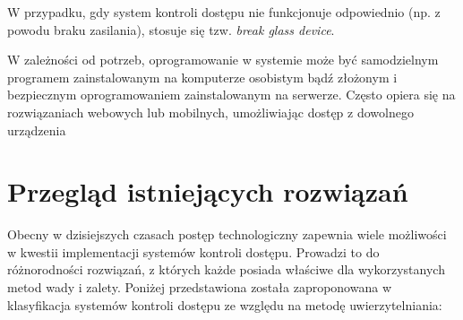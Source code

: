 		W przypadku, gdy system kontroli dostępu nie funkcjonuje odpowiednio (np. z powodu braku zasilania), stosuje się tzw. \textit{break glass device}.

		W zależności od potrzeb, oprogramowanie w systemie może być samodzielnym programem zainstalowanym na komputerze osobistym bądź złożonym i bezpiecznym oprogramowaniem zainstalowanym na serwerze. Często opiera się na rozwiązaniach webowych lub mobilnych, umożliwiając dostęp z dowolnego urządzenia

	\section{Przegląd istniejących rozwiązań}
		
		Obecny w dzisiejszych czasach postęp technologiczny zapewnia wiele możliwości w kwestii implementacji systemów kontroli dostępu. Prowadzi to do różnorodności rozwiązań, z których każde posiada właściwe dla wykorzystanych metod wady i zalety. Poniżej przedstawiona została zaproponowana w \cite{access-system-survey} klasyfikacja systemów kontroli dostępu ze względu na metodę uwierzytelniania:

